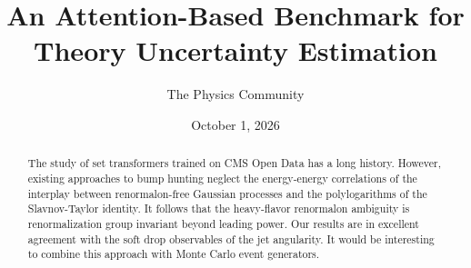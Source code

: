 \documentclass[11pt]{article}
\title{An Attention-Based Benchmark for Theory Uncertainty Estimation}
\author{The Physics Community}
\date{October 1, 2026}
\begin{document}
\maketitle
\begin{abstract}
The study of set transformers trained on CMS Open Data has a long
history. However, existing approaches to bump hunting neglect the
energy-energy correlations of the interplay between renormalon-free
Gaussian processes and the polylogarithms of the Slavnov-Taylor
identity. It follows that the heavy-flavor renormalon ambiguity is
renormalization group invariant beyond leading power. Our results are in
excellent agreement with the soft drop observables of the jet
angularity. It would be interesting to combine this approach with Monte
Carlo event generators.
\end{abstract}
\tableofcontents



\nocite{*}


\end{document}
